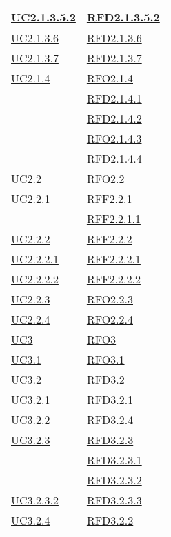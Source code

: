 \begin{longtable}{|>{\centering}m{5cm}|m{5cm}<{\centering}|}
\hyperref[UC2.1.3.5.2]{UC2.1.3.5.2} & \hyperlink{RFD2.1.3.5.2}{RFD2.1.3.5.2}\\ \hline
\hyperref[UC2.1.3.6]{UC2.1.3.6} & \hyperlink{RFD2.1.3.6}{RFD2.1.3.6}\\ \hline
\hyperref[UC2.1.3.7]{UC2.1.3.7} & \hyperlink{RFD2.1.3.7}{RFD2.1.3.7}\\ \hline
\hyperref[UC2.1.4]{UC2.1.4} & \hyperlink{RFO2.1.4}{RFO2.1.4}\\
& \hyperlink{RFD2.1.4.1}{RFD2.1.4.1}\\
& \hyperlink{RFD2.1.4.2}{RFD2.1.4.2}\\
& \hyperlink{RFO2.1.4.3}{RFO2.1.4.3}\\
& \hyperlink{RFD2.1.4.4}{RFD2.1.4.4}\\ \hline
\hyperref[UC2.2]{UC2.2} & \hyperlink{RFO2.2}{RFO2.2}\\ \hline
\hyperref[UC2.2.1]{UC2.2.1} & \hyperlink{RFF2.2.1}{RFF2.2.1}\\
& \hyperlink{RFF2.2.1.1}{RFF2.2.1.1}\\ \hline
\hyperref[UC2.2.2]{UC2.2.2} & \hyperlink{RFF2.2.2}{RFF2.2.2}\\ \hline
\hyperref[UC2.2.2.1]{UC2.2.2.1} & \hyperlink{RFF2.2.2.1}{RFF2.2.2.1}\\ \hline
\hyperref[UC2.2.2.2]{UC2.2.2.2} & \hyperlink{RFF2.2.2.2}{RFF2.2.2.2}\\ \hline
\hyperref[UC2.2.3]{UC2.2.3} & \hyperlink{RFO2.2.3}{RFO2.2.3}\\ \hline
\hyperref[UC2.2.4]{UC2.2.4} & \hyperlink{RFO2.2.4}{RFO2.2.4}\\ \hline
\hyperref[UC3]{UC3} & \hyperlink{RFO3}{RFO3}\\ \hline
\hyperref[UC3.1]{UC3.1} & \hyperlink{RFO3.1}{RFO3.1}\\ \hline
\hyperref[UC3.2]{UC3.2} & \hyperlink{RFD3.2}{RFD3.2}\\ \hline
\hyperref[UC3.2.1]{UC3.2.1} & \hyperlink{RFD3.2.1}{RFD3.2.1}\\ \hline
\hyperref[UC3.2.2]{UC3.2.2} & \hyperlink{RFD3.2.4}{RFD3.2.4}\\ \hline
\hyperref[UC3.2.3]{UC3.2.3} & \hyperlink{RFD3.2.3}{RFD3.2.3}\\
& \hyperlink{RFD3.2.3.1}{RFD3.2.3.1}\\
& \hyperlink{RFD3.2.3.2}{RFD3.2.3.2}\\ \hline
\hyperref[UC3.2.3.2]{UC3.2.3.2} & \hyperlink{RFD3.2.3.3}{RFD3.2.3.3}\\ \hline
\hyperref[UC3.2.4]{UC3.2.4} & \hyperlink{RFD3.2.2}{RFD3.2.2}\\ \hline

\end{longtable}
